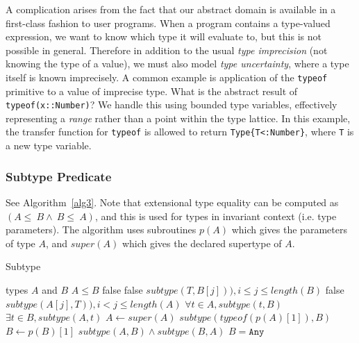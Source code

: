 \documentclass[9pt]{sigplanconf}
\begin{document}
A complication arises from the fact that our abstract domain is
available in a first-class fashion to user programs. When a program
contains a type-valued expression, we want to know which type it will
evaluate to, but this is not possible in general. Therefore in addition
to the usual \emph{type imprecision} (not knowing the type of a value),
we must also model \emph{type uncertainty}, where a type itself is
known imprecisely. A common example is application of the {\tt typeof}
primitive to a value of imprecise type. What is the abstract result of
{\tt typeof(x::Number)}? We handle this using bounded type variables,
effectively representing a \emph{range} rather than a point within the
type lattice. In this example, the
transfer function for {\tt typeof} is allowed to return
{\tt Type\{T<:Number\}}, where {\tt T} is a new type variable.


\subsubsection{Subtype Predicate}

See Algorithm~\ref{alg3}. Note that extensional type equality can be
computed as $(A\leq~B\land~B\leq~A)$, and this is used for types in
invariant context (i.e. type parameters). The algorithm uses subroutines
$p(A)$ which gives the parameters of type $A$, and $super(A)$ which gives
the declared supertype of $A$.

\begin{algorithm}
\caption{Subtype}
\label{alg3}
\begin{algorithmic}
\REQUIRE types $A$ and $B$
\ENSURE $A \leq B$
  \RETURN false
 \ENDIF
    \RETURN false
   \ENDIF
   \RETURN $subtype(T,B[j])), i \leq j \leq length(B)$
   \RETURN false
   \RETURN $subtype(A[j],T)), i < j \leq length(A)$
  \ENDIF
 \ENDFOR
{}
 \RETURN $\forall t \in A, subtype(t,B)$
 \RETURN $\exists t \in B, subtype(A,t)$
\ENDIF
{}
 \ENDIF
 \STATE $A \leftarrow super(A)$
\ENDWHILE
{}
 \RETURN $subtype(typeof(p(A)[1]),B)$
 \STATE $B \leftarrow p(B)[1]$
 \RETURN $subtype(A,B) \land subtype(B,A)$
\ENDIF
\RETURN $B = \texttt{Any}$
\end{algorithmic}
\end{algorithm}
\end{document}
